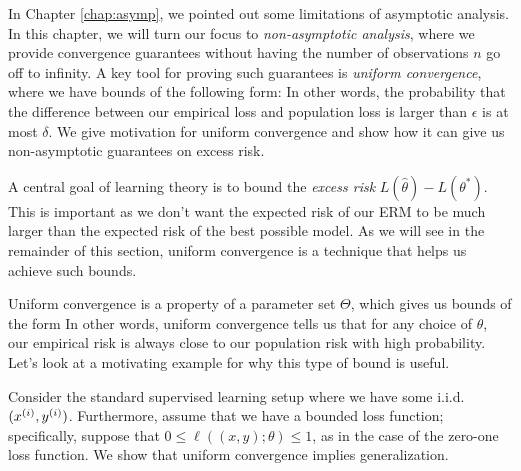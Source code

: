 \setcounter{section}{0}


In Chapter \ref{chap:asymp}, we pointed out some limitations of asymptotic analysis. In this chapter, we will turn our focus to \textit{non-asymptotic analysis}, where we provide convergence guarantees without having the number of observations $n$ go off to infinity. A key tool for proving such guarantees is \textit{uniform convergence}, where we have bounds of the following form:
In other words, the probability that the difference between our empirical loss and population loss is larger than $\epsilon$ is at most $\delta$. We give motivation for uniform convergence and show how it can give us non-asymptotic guarantees on excess risk.


A central goal of learning theory is to bound the \emph{excess risk} $L(\hat{\theta}) - L(\theta^*)$. This is important as we don't want the expected risk of our ERM to be much larger than the expected risk of the best possible model. As we will see in the remainder of this section, uniform convergence is a technique that helps us achieve such bounds.

Uniform convergence is a property of a parameter set $\Theta$, which gives us bounds of the form
In other words, uniform convergence tells us that for any choice of $\theta$, our empirical risk is always close to our population risk with high probability. Let's look at a motivating example for why this type of bound is useful.

\label{sec:uc-gen}

Consider the standard supervised learning setup where we have some i.i.d. $(x\sp{i}, y\sp{i})$. Furthermore, assume that we have a bounded loss function; specifically, suppose that $0 \leq \ell((x, y); \theta) \leq 1$, as in the case of the zero-one loss function. We show that uniform convergence implies generalization.

